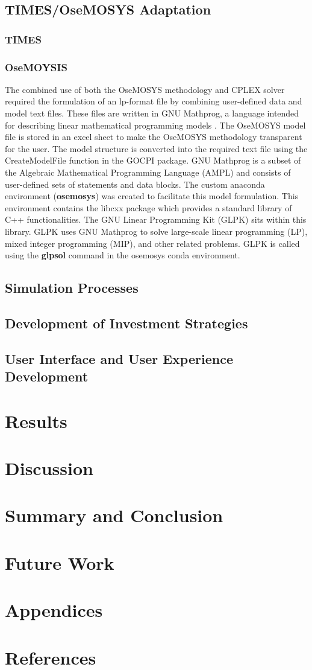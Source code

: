 \documentclass[12pt]{article}
\begin{document}
\subsection{TIMES/OseMOSYS Adaptation}
\subsubsection{TIMES}
\subsubsection{OseMOYSIS}\label{OseMOSYS}
The combined use of both the OseMOSYS methodology and CPLEX solver required the formulation of an lp-format file by combining user-defined data and model text files.
These files are written in GNU Mathprog, a language intended for describing linear mathematical programming models \cite{GNU_Mathprog}. 
The OseMOSYS model file is stored in an excel sheet to make the OseMOSYS methodology transparent for the user. 
The model structure is converted into the required text file using the CreateModelFile function in the GOCPI package.
GNU Mathprog is a subset of the Algebraic Mathematical Programming Language (AMPL) \cite{AMPL} and consists of user-defined sets of statements and data blocks.
The custom anaconda environment (\textbf{osemosys}) was created to facilitate this model formulation. This environment contains the libcxx package which provides a standard library of C++ functionalities.
The GNU Linear Programming Kit (GLPK) sits within this library. GLPK uses GNU Mathprog to solve large-scale linear programming (LP), mixed integer programming (MIP), and other related problems. 
GLPK is called using the \textbf{glpsol} command in the osemosys conda environment. 
\subsection{Simulation Processes}
\subsection{Development of Investment Strategies}
\subsection{User Interface and User Experience Development}
\newpage
\section{Results}
\newpage
\section{Discussion}
\newpage
\section{Summary and Conclusion}
\newpage
\section{Future Work}
\newpage
\section{Appendices}
\newpage
\section{References}
\printbibliography
\end{document}
